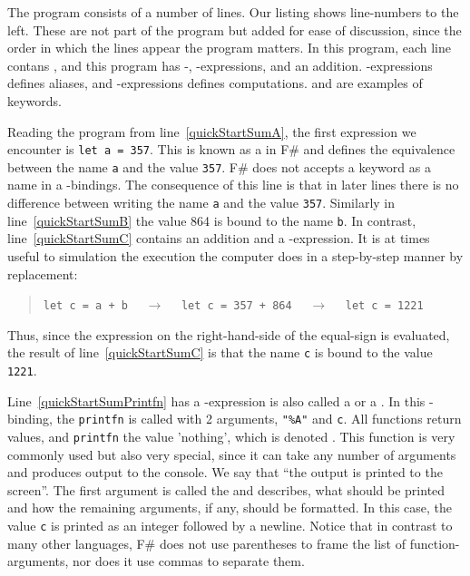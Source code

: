\documentclass[springer.tex]{subfiles}
\begin{document}
The program consists of a number of lines. Our listing shows line-numbers to the left. These are not part of the program but added for ease of discussion, since the order in which the lines appear the program matters. In this program, each line contans , and this program has -, -expressions, and an addition. -expressions defines aliases, and -expressions defines computations.  and  are examples of keywords.

Reading the program from line~\ref{quickStartSumA}, the first expression we encounter is \lstinline|let a = 357|. This is known as a  in F\# and defines the equivalence between the name \lstinline{a} and the value \lstinline{357}. F\# does not accepts a keyword as a name in a -bindings. The consequence of this line is that in later lines there is no difference between writing the name \lstinline{a} and the value \lstinline{357}.
Similarly in line~\ref{quickStartSumB} the value 864 is bound to the name \lstinline|b|. In contrast, line~\ref{quickStartSumC} contains an addition and a -expression. It is at times useful to simulation the execution the computer does in a step-by-step manner by replacement:
\begin{quote}
  \lstinline{let c = a + b} $\quad\rightarrow\quad$  \lstinline{let c = 357 + 864}  $\quad\rightarrow\quad$  \lstinline{let c = 1221}
\end{quote}
Thus, since the expression on the right-hand-side of the equal-sign is evaluated, the result of line~\ref{quickStartSumC} is that the name \lstinline{c} is bound to the value \lstinline{1221}.

Line~\ref{quickStartSumPrintfn} has a -expression is also called a  or a . In this -binding, the    \lstinline{printfn} is called with 2 arguments, \lstinline{"%A"}%
  and \lstinline{c}. All functions return values, and \lstinline|printfn| the value 'nothing', which is denoted \idx[{()}@\lstinline{()}]{\lexeme{()}}. This function is very commonly used but also very special, since it can take any number of arguments and produces output to the console. We say that ``the output is printed to the screen''. The first argument is called the  and describes, what should be printed and how the remaining arguments, if any, should be formatted. In this case, the value \lstinline{c} is printed as an integer followed by a newline. Notice that in contrast to many other languages, F\# does not use parentheses to frame the list of function-arguments, nor does it use commas to separate them.
\end{document}
